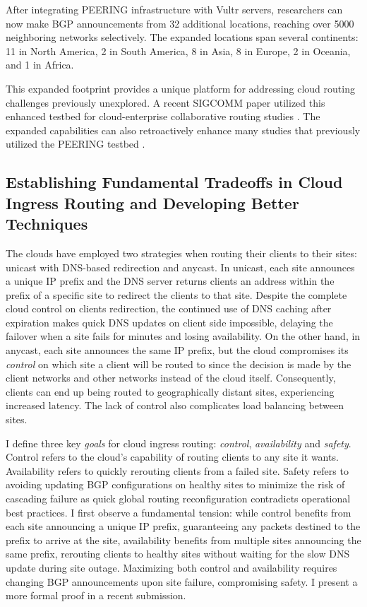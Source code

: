 \documentclass[sigconf,nonacm,screen,letterpaper,9pt]{acmart}
\begin{document}
After integrating PEERING infrastructure with Vultr servers, researchers
can now make BGP announcements from 32 additional locations, reaching
over 5000 neighboring networks selectively. The expanded locations span
several continents: 11 in North America, 2 in South America, 8 in Asia,
8 in Europe, 2 in Oceania, and 1 in Africa.

This expanded footprint provides a unique platform for addressing cloud
routing challenges previously unexplored. A recent SIGCOMM paper
utilized this enhanced testbed for cloud-enterprise collaborative
routing studies \cite{painter}. The expanded capabilities can also
retroactively enhance many studies that previously utilized the PEERING
testbed \cite{imc-jc-deanony, anycast-agility}.

\hypertarget{establishing-fundamental-tradeoffs-in-cloud-ingress-routing-and-developing-better-techniques}{%
\subsection{Establishing Fundamental Tradeoffs in Cloud Ingress Routing
and Developing Better
Techniques}\label{establishing-fundamental-tradeoffs-in-cloud-ingress-routing-and-developing-better-techniques}}

\label{sec:pareto} The clouds have employed two strategies when routing
their clients to their sites: unicast with DNS-based redirection and
anycast. In unicast, each site announces a unique IP prefix and the DNS
server returns clients an address within the prefix of a specific site
to redirect the clients to that site. Despite the complete cloud control
on clients redirection, the continued use of DNS caching after
expiration makes quick DNS updates on client side impossible, delaying
the failover when a site fails for minutes and losing availability. On
the other hand, in anycast, each site announces the same IP prefix, but
the cloud compromises its \emph{control} on which site a client will be
routed to since the decision is made by the client networks and other
networks instead of the cloud itself. Consequently, clients can end up
being routed to geographically distant sites, experiencing increased
latency. The lack of control also complicates load balancing between
sites.

I define three key \emph{goals} for cloud ingress routing:
\emph{control}, \emph{availability} and \emph{safety}. Control refers to
the cloud's capability of routing clients to any site it wants.
Availability refers to quickly rerouting clients from a failed site.
Safety refers to avoiding updating BGP configurations on healthy sites
to minimize the risk of cascading failure as quick global routing
reconfiguration contradicts operational best practices. I first observe
a fundamental tension: while control benefits from each site announcing
a unique IP prefix, guaranteeing any packets destined to the prefix to
arrive at the site, availability benefits from multiple sites announcing
the same prefix, rerouting clients to healthy sites without waiting for
the slow DNS update during site outage. Maximizing both control and
availability requires changing BGP announcements upon site failure,
compromising safety. I present a more formal proof in a recent
submission.
\end{document}
